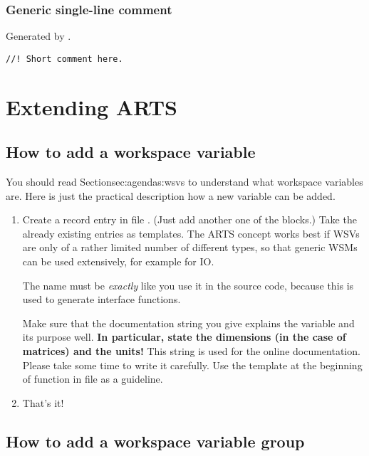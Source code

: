 \subsubsection{Generic single-line comment}

Generated by .

\begin{verbatim}
//! Short comment here.
\end{verbatim}


\section{Extending ARTS}
 \label{sec:development:extending}

\subsection{How to add a workspace variable}

You should read Section{sec:agendas:wsvs} to understand what workspace
variables are. Here is just the practical description how a new
variable can be added.

\begin{enumerate}
\item Create a record entry in file . (Just add
  another one of the  blocks.) Take the
  already existing entries as templates. The ARTS concept works best
  if WSVs are only of a rather limited number of different types, so
  that generic WSMs can be used extensively, for example for IO.
      
  The name must be \emph{exactly} like you use it in the source code,
  because this is used to generate interface functions.
  
  Make sure that the documentation string you give explains the
  variable and its purpose well. \textbf{In particular, state the
    dimensions (in the case of matrices) and the units!} This string
  is used for the online documentation. Please take some time to write
  it carefully. Use the template at the beginning of function
   in file  as a
  guideline. 

\item That's it!
\end{enumerate}


\subsection{How to add a workspace variable group}

